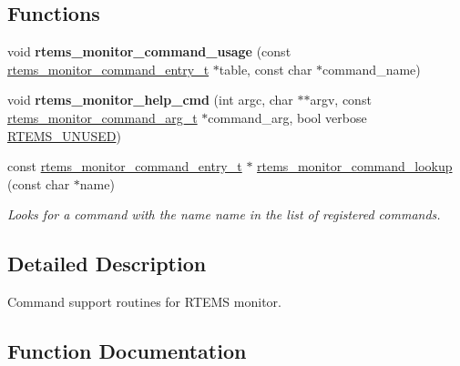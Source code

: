 \subsection*{Functions}
\begin{DoxyCompactItemize}
\item 
\mbox{\label{mon-command_8c_a345602c67fe036a40e3a07c5cc05999f}} 
void {\bfseries rtems\+\_\+monitor\+\_\+command\+\_\+usage} (const \mbox{\hyperlink{structrtems__monitor__command__entry__s}{rtems\+\_\+monitor\+\_\+command\+\_\+entry\+\_\+t}} $\ast$table, const char $\ast$command\+\_\+name)
\item 
\mbox{\label{mon-command_8c_a6d3f650c8aaa6bfa39c84a5cd002ba05}} 
void {\bfseries rtems\+\_\+monitor\+\_\+help\+\_\+cmd} (int argc, char $\ast$$\ast$argv, const \mbox{\hyperlink{union__rtems__monitor__command__arg__t}{rtems\+\_\+monitor\+\_\+command\+\_\+arg\+\_\+t}} $\ast$command\+\_\+arg, bool verbose \mbox{\hyperlink{group__RTEMSScoreBaseDefs_ga6794c0ff237a90e837e19f9bbcae4297}{R\+T\+E\+M\+S\+\_\+\+U\+N\+U\+S\+ED}})
\item 
const \mbox{\hyperlink{structrtems__monitor__command__entry__s}{rtems\+\_\+monitor\+\_\+command\+\_\+entry\+\_\+t}} $\ast$ \mbox{\hyperlink{mon-command_8c_a8ed4eec2eee505958982dcbc7651582a}{rtems\+\_\+monitor\+\_\+command\+\_\+lookup}} (const char $\ast$name)
\begin{DoxyCompactList}\small\item\em Looks for a command with the name {\itshape name} in the list of registered commands. \end{DoxyCompactList}\end{DoxyCompactItemize}


\subsection{Detailed Description}
Command support routines for R\+T\+E\+MS monitor. 



\subsection{Function Documentation}
\mbox{\label{mon-command_8c_a8ed4eec2eee505958982dcbc7651582a}} 
